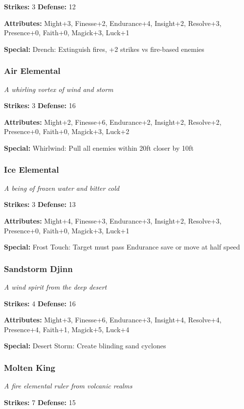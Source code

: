 \documentclass[10pt,twoside]{article}
\begin{document}
\textbf{Strikes:} 3 \quad \textbf{Defense:} 12

\textbf{Attributes:} Might+3, Finesse+2, Endurance+4, Insight+2, Resolve+3, Presence+0, Faith+0, Magick+3, Luck+1

\textbf{Special:} Drench: Extinguish fires, +2 strikes vs fire-based enemies

\subsubsection{Air Elemental}
\textit{A whirling vortex of wind and storm}

\textbf{Strikes:} 3 \quad \textbf{Defense:} 16

\textbf{Attributes:} Might+2, Finesse+6, Endurance+2, Insight+2, Resolve+2, Presence+0, Faith+0, Magick+3, Luck+2

\textbf{Special:} Whirlwind: Pull all enemies within 20ft closer by 10ft

\subsubsection{Ice Elemental}
\textit{A being of frozen water and bitter cold}

\textbf{Strikes:} 3 \quad \textbf{Defense:} 13

\textbf{Attributes:} Might+4, Finesse+3, Endurance+3, Insight+2, Resolve+3, Presence+0, Faith+0, Magick+3, Luck+1

\textbf{Special:} Frost Touch: Target must pass Endurance save or move at half speed

\subsubsection{Sandstorm Djinn}
\textit{A wind spirit from the deep desert}

\textbf{Strikes:} 4 \quad \textbf{Defense:} 16

\textbf{Attributes:} Might+3, Finesse+6, Endurance+3, Insight+4, Resolve+4, Presence+4, Faith+1, Magick+5, Luck+4

\textbf{Special:} Desert Storm: Create blinding sand cyclones

\subsubsection{Molten King}
\textit{A fire elemental ruler from volcanic realms}

\textbf{Strikes:} 7 \quad \textbf{Defense:} 15
\end{document}
